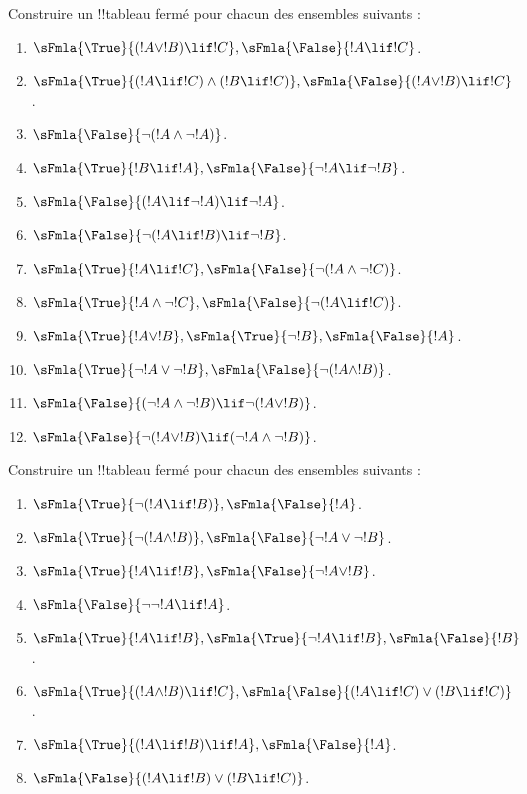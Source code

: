 \documentclass[../../../include/open-logic-section]{subfiles}
\begin{document}
\begin{prob}
Construire un !!{tableau} fermé pour chacun des ensembles suivants :
\begin{enumerate}
\item $\sFmla{\True}{(!A \lor !B) \lif !C}, \sFmla{\False}{!A \lif !C}$.
\item $\sFmla{\True}{(!A \lif !C) \land (!B \lif !C)}, \sFmla{\False}{(!A \lor !B) \lif !C}$.
\item $\sFmla{\False}{\lnot(!A \land \lnot !A)}$.
\item $\sFmla{\True}{!B \lif !A}, \sFmla{\False}{\lnot !A \lif \lnot !B}$.
\item $\sFmla{\False}{(!A \lif \lnot !A) \lif \lnot !A}$.
\item $\sFmla{\False}{\lnot(!A \lif !B) \lif \lnot !B}$.
\item $\sFmla{\True}{!A \lif !C}, \sFmla{\False}{\lnot (!A \land \lnot !C)}$.
\item $\sFmla{\True}{!A \land \lnot !C}, \sFmla{\False}{\lnot (!A \lif !C)}$.
\item $\sFmla{\True}{!A \lor !B}, \sFmla{\True}{\lnot !B},
  \sFmla{\False}{!A}$.
\item $\sFmla{\True}{\lnot !A \lor \lnot !B}, \sFmla{\False}{\lnot(!A \land !B)}$.
\item $\sFmla{\False}{(\lnot !A \land \lnot !B) \lif\lnot(!A \lor !B)}$.
\item $\sFmla{\False}{\lnot(!A \lor !B) \lif (\lnot !A \land \lnot !B)}$.
\end{enumerate}
\end{prob}

%
%
%
%
%
%
%

\begin{prob}
Construire un !!{tableau} fermé pour chacun des ensembles suivants :
\begin{enumerate}
\item $\sFmla{\True}{\lnot(!A \lif !B)}, \sFmla{\False}{!A}$.
\item $\sFmla{\True}{\lnot(!A \land !B)}, \sFmla{\False}{\lnot !A \lor \lnot !B}$.
\item $\sFmla{\True}{!A \lif !B}, \sFmla{\False}{\lnot !A \lor !B}$.
\item $\sFmla{\False}{\lnot \lnot !A \lif !A}$.
\item $\sFmla{\True}{!A \lif !B}, \sFmla{\True}{\lnot !A \lif !B}, \sFmla{\False}{!B}$.
\item $\sFmla{\True}{(!A \land !B) \lif !C}, \sFmla{\False}{(!A \lif !C) \lor (!B \lif !C)}$.
\item $\sFmla{\True}{(!A \lif !B) \lif !A}, \sFmla{\False}{!A}$.
\item $\sFmla{\False}{(!A \lif !B) \lor (!B \lif !C)}$.
\end{enumerate}
\end{prob}
\end{document}

